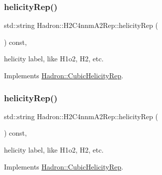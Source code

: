 \mbox{\label{structHadron_1_1H2C4nnmA2Rep_a6f9741481d738e4bf6b7b5f035dac13c}} 
\subsubsection{\texorpdfstring{helicityRep()}{helicityRep()}\hspace{0.1cm}{\footnotesize\ttfamily [1/2]}}
{\footnotesize\ttfamily std\+::string Hadron\+::\+H2\+C4nnm\+A2\+Rep\+::helicity\+Rep (\begin{DoxyParamCaption}{ }\end{DoxyParamCaption}) const\hspace{0.3cm}{\ttfamily [inline]}, {\ttfamily [virtual]}}

helicity label, like H1o2, H2, etc. 

Implements \mbox{\hyperlink{structHadron_1_1CubicHelicityRep_af1096946b7470edf0a55451cc662f231}{Hadron\+::\+Cubic\+Helicity\+Rep}}.

\mbox{\label{structHadron_1_1H2C4nnmA2Rep_a6f9741481d738e4bf6b7b5f035dac13c}} 
\subsubsection{\texorpdfstring{helicityRep()}{helicityRep()}\hspace{0.1cm}{\footnotesize\ttfamily [2/2]}}
{\footnotesize\ttfamily std\+::string Hadron\+::\+H2\+C4nnm\+A2\+Rep\+::helicity\+Rep (\begin{DoxyParamCaption}{ }\end{DoxyParamCaption}) const\hspace{0.3cm}{\ttfamily [inline]}, {\ttfamily [virtual]}}

helicity label, like H1o2, H2, etc. 

Implements \mbox{\hyperlink{structHadron_1_1CubicHelicityRep_af1096946b7470edf0a55451cc662f231}{Hadron\+::\+Cubic\+Helicity\+Rep}}.

\mbox{\label{structHadron_1_1H2C4nnmA2Rep_ab3b885d6ae0238dfffab82f55bbf4a2d}} 
